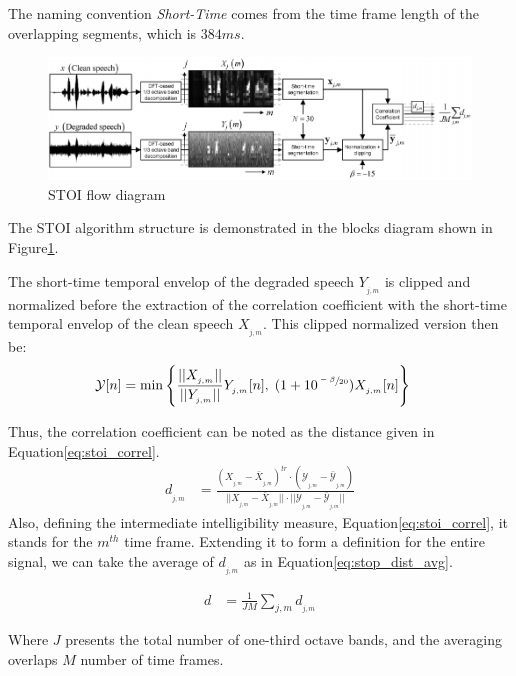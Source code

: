 The naming convention \emph{Short-Time} comes from the time frame length
of the overlapping segments, which is \(384 ms\).  
\begin{figure}[H]
    \centering
    \includegraphics[width=0.75\linewidth]{Features/images/stoi_blocks_diagram}
    \caption{STOI flow diagram}\label{fig:stoi_blocks_diagram}
\end{figure}

The STOI algorithm structure is demonstrated in 
the blocks diagram shown in Figure\;\ref{fig:stoi_blocks_diagram}. 

The short-time temporal envelop of the degraded
speech \(Y_{_{j,m}}\) is clipped and normalized
before the extraction of the correlation coefficient
with the short-time temporal envelop of the
clean speech \(X_{_{j,m}}\).
This clipped normalized version then be:
\begin{align}
    \mathcal{Y}[n] & = \min\Bigg\{ 
            \frac{||X_{_{j,m}}||}{||Y_{_{j,m}}||} Y_{_{j,m}}[n]
            ,\; (1+10^{\sfrac{-\beta}{20}})X_{_{j,m}}[n]
        \Bigg\}
\end{align}

Thus, the correlation coefficient can be noted as the
distance given in Equation\;\ref{eq:stoi_correl}.
\begin{align}\label{eq:stoi_correl}
    d_{_{j,m}} & = \frac{
            (X_{_{j,m}}-\bar{X}_{_{j,m}})^{tr} 
            \cdot (\mathcal{Y}_{_{j,m}}-\bar{\mathcal{Y}}_{_{j,m}})
        }
        {
            ||X_{_{j,m}}-\bar{X}_{_{j,m}}||
            \cdot ||\mathcal{Y}_{_{j,m}}-\bar{\mathcal{Y}}_{_{j,m}}|| 
        }
\end{align}
Also, defining the intermediate intelligibility measure, 
Equation\;\ref{eq:stoi_correl}, it stands for the
\(m^{th}\) time frame. Extending it to form
a definition for the entire signal,
we can take the average of \(d_{_{j,m}}\)
as in Equation\;\ref{eq:stop_dist_avg}.

\begin{align}\label{eq:stop_dist_avg}
    d & = \frac{1}{JM} \sum_{j,m} d_{_{j,m}}
\end{align}

Where \(J\) presents the total number of one-third octave bands,
and the averaging overlaps \(M\) number of time frames.

